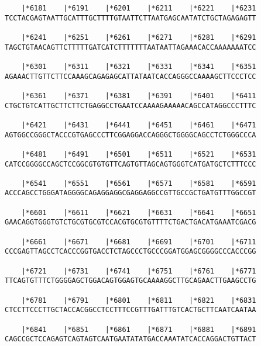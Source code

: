 \documentclass{article}
\begin{document}
\begin{Verbatim}
    |*6181    |*6191    |*6201    |*6211    |*6221    |*6231
TCCTACGAGTAATTGCATTTGCTTTTGTAATTCTTAATGAGCAATATCTGCTAGAGAGTT
                                                            
    |*6241    |*6251    |*6261    |*6271    |*6281    |*6291
TAGCTGTAACAGTTCTTTTTGATCATCTTTTTTTAATAATTAGAAACACCAAAAAAATCC
                                                            
    |*6301    |*6311    |*6321    |*6331    |*6341    |*6351
AGAAACTTGTTCTTCCAAAGCAGAGAGCATTATAATCACCAGGGCCAAAAGCTTCCCTCC
                                                            
    |*6361    |*6371    |*6381    |*6391    |*6401    |*6411
CTGCTGTCATTGCTTCTTCTGAGGCCTGAATCCAAAAGAAAAACAGCCATAGGCCCTTTC
                                                            
    |*6421    |*6431    |*6441    |*6451    |*6461    |*6471
AGTGGCCGGGCTACCCGTGAGCCCTTCGGAGGACCAGGGCTGGGGCAGCCTCTGGGCCCA
                                                            
    |*6481    |*6491    |*6501    |*6511    |*6521    |*6531
CATCCGGGGCCAGCTCCGGCGTGTGTTCAGTGTTAGCAGTGGGTCATGATGCTCTTTCCC
                                                            
    |*6541    |*6551    |*6561    |*6571    |*6581    |*6591
ACCCAGCCTGGGATAGGGGCAGAGGAGGCGAGGAGGCCGTTGCCGCTGATGTTTGGCCGT
                                                            
    |*6601    |*6611    |*6621    |*6631    |*6641    |*6651
GAACAGGTGGGTGTCTGCGTGCGTCCACGTGCGTGTTTTCTGACTGACATGAAATCGACG
                                                            
    |*6661    |*6671    |*6681    |*6691    |*6701    |*6711
CCCGAGTTAGCCTCACCCGGTGACCTCTAGCCCTGCCCGGATGGAGCGGGGCCCACCCGG
                                                            
    |*6721    |*6731    |*6741    |*6751    |*6761    |*6771
TTCAGTGTTTCTGGGGAGCTGGACAGTGGAGTGCAAAAGGCTTGCAGAACTTGAAGCCTG
                                                            
    |*6781    |*6791    |*6801    |*6811    |*6821    |*6831
CTCCTTCCCTTGCTACCACGGCCTCCTTTCCGTTTGATTTGTCACTGCTTCAATCAATAA
                                                            
    |*6841    |*6851    |*6861    |*6871    |*6881    |*6891
CAGCCGCTCCAGAGTCAGTAGTCAATGAATATATGACCAAATATCACCAGGACTGTTACT
                                                            

\end{Verbatim}
\end{document}
